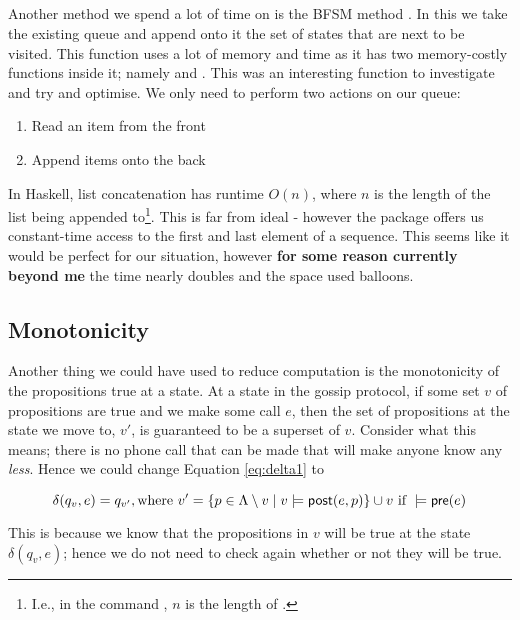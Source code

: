 \documentclass[10pt, a4paper]{report}
\begin{document}
\subsection{}

Another method we spend a lot of time on is the BFSM method . In
this we take the existing queue and append onto it the set of states that are
next to be visited. This function uses a lot of memory and time as it has two
memory-costly functions inside it; namely  and \mih{(++)}.
This was an interesting function to investigate and try and optimise. We only
need to perform two actions on our queue:

\begin{enumerate}
\item Read an item from the front
\item Append items onto the back
\end{enumerate}

In Haskell, list concatenation has runtime $O(n)$, where $n$ is the length of
the list being appended to\footnote{I.e., in the command , $n$
  is the length of .}. This is far from ideal - however the
 package offers us constant-time access to the first and last
element of a sequence. This seems like it would be perfect for our situation,
however \textbf{for some reason currently beyond me} the time nearly doubles and
the space used balloons.

\subsection{Monotonicity}
\label{sec:Monotonicity}

Another thing we could have used to reduce computation is the monotonicity of
the propositions true at a state. At a state in the gossip protocol, if some set
$v$ of propositions are true and we make some call $e$, then the set of
propositions at the state we move to, $v'$, is guaranteed to be a superset of
$v$. Consider what this means; there is no phone call that can be made that will
make anyone know any \emph{less}. Hence we could change Equation
\ref{eq:delta1} to

\begin{equation} \label{eq:delta2}
  \delta(q_v, e) = q_{v'}, \text{where } v' = \{p \in \Lambda \setminus v \mid v \models \textsf{post}(e, p)\} \cup v
  \text{ if } 
  \models \textsf{pre}(e)
\end{equation}

This is because we know that the propositions in $v$ will be true at the state
$\delta(q_v, e)$; hence we do not need to check again whether or not they will
be true. 
\end{document}
